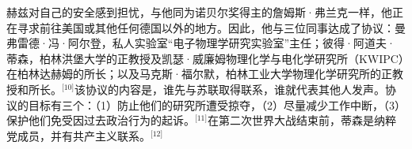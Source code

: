 赫兹对自己的安全感到担忧，与他同为诺贝尔奖得主的詹姆斯·弗兰克一样，他正在寻求前往美国或其他任何德国以外的地方。因此，他与三位同事达成了协议：曼弗雷德·冯·阿尔登，私人实验室“电子物理学研究实验室”主任；彼得·阿道夫·蒂森，柏林洪堡大学的正教授及凯瑟·威廉姆物理化学与电化学研究所（KWIPC）在柏林达赫姆的所长；以及马克斯·福尔默，柏林工业大学物理化学研究所的正教授和所长。\(^\text{[10]}\)该协议的内容是，谁先与苏联取得联系，谁就代表其他人发声。协议的目标有三个：（1）防止他们的研究所遭受掠夺，（2）尽量减少工作中断，（3）保护他们免受因过去政治行为的起诉。\(^\text{[11]}\)在第二次世界大战结束前，蒂森是纳粹党成员，并有共产主义联系。\(^\text{[12]}\)
